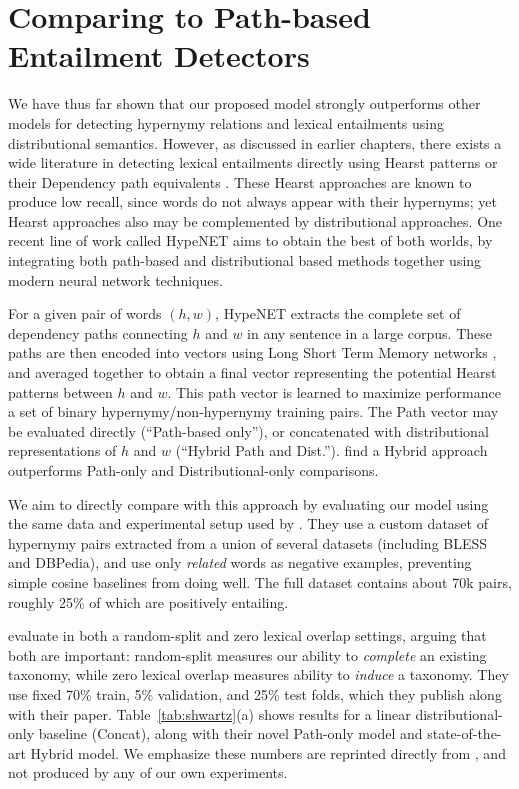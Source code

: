 \section{Comparing to Path-based Entailment Detectors}

We have thus far shown that our proposed model strongly outperforms other
models for detecting hypernymy relations and lexical entailments using
distributional semantics. However, as discussed in earlier chapters, there
exists a wide literature in detecting lexical entailments directly using
Hearst patterns \cite{hearst:1992:coling} or their Dependency path
equivalents \cite{snow:2004:nips,girju:2006:cl}. These Hearst approaches are
known to produce low recall, since words do not always appear with their
hypernyms; yet Hearst approaches also may be complemented by distributional
approaches.
One recent line of work called HypeNET \cite{shwartz:2016:acl} aims to obtain
the best of both worlds, by integrating both path-based and distributional
based methods together using modern neural network techniques.

For a given pair of words $(h, w)$, HypeNET extracts the complete set of
dependency paths connecting $h$ and $w$ in any sentence in a large corpus.
These paths are then encoded into vectors using Long Short Term Memory networks
\cite{hochreiter:1997:nc}, and averaged together to obtain a final vector
representing the potential Hearst patterns between $h$ and $w$.  This path
vector is learned to maximize performance a set of binary
hypernymy/non-hypernymy training pairs. The Path vector may be evaluated
directly (``Path-based only''), or concatenated with distributional
representations of $h$ and $w$ (``Hybrid Path and Dist.'').
 find a Hybrid approach outperforms Path-only and
Distributional-only comparisons.

We aim to directly compare with this approach by evaluating our model using
the same data and experimental setup used by .
They use a custom dataset of hypernymy pairs extracted from a union of several
datasets (including BLESS and DBPedia), and use only {\em related} words
as negative examples, preventing simple cosine baselines from doing well.
The full dataset contains about 70k pairs, roughly 25\% of which are positively
entailing.

 evaluate in both a random-split and
zero lexical overlap settings, arguing that both are important: random-split
measures our ability to {\em complete} an existing taxonomy, while
zero lexical overlap measures ability to {\em induce} a taxonomy.
They use fixed 70\% train, 5\% validation, and 25\% test folds, which they
publish along with their paper.  Table~\ref{tab:shwartz}(a) shows
results for a linear distributional-only baseline (Concat), along with their
novel Path-only model and state-of-the-art Hybrid model. We emphasize these
numbers are reprinted directly from , and not
produced by any of our own experiments.

